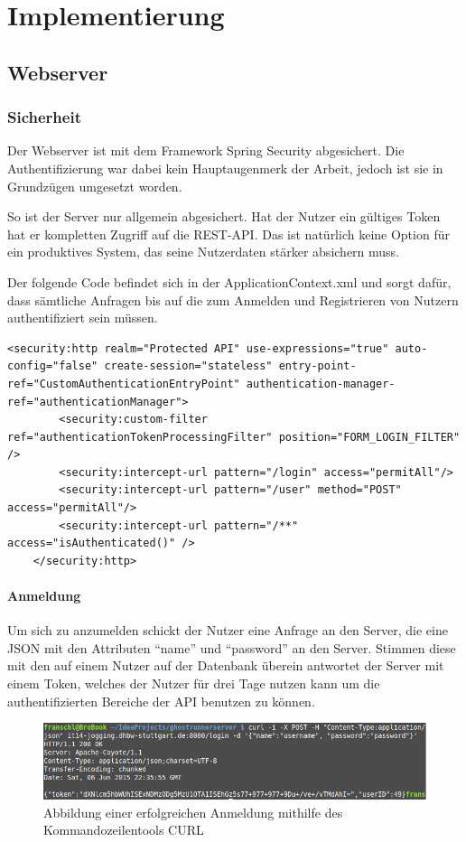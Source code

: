 \section{Implementierung}\label{kapitel6}
\subsection{Webserver}
\subsubsection{Sicherheit}
Der Webserver ist mit dem Framework Spring Security abgesichert. Die Authentifizierung war dabei kein Hauptaugenmerk der Arbeit, jedoch ist sie in Grundzügen umgesetzt worden. 

So ist der Server nur allgemein abgesichert. Hat der Nutzer ein gültiges Token hat er kompletten Zugriff auf die REST-API. Das ist natürlich keine Option für ein produktives System, das seine Nutzerdaten stärker absichern muss.

Der folgende Code befindet sich in der ApplicationContext.xml und sorgt dafür, dass sämtliche Anfragen bis auf die zum Anmelden und Registrieren von Nutzern authentifiziert sein müssen.
\lstset{language=xml}
\begin{lstlisting}[frame=htrbl, caption={Ausschnit aus der Datei ApplicationContext.xml}, breaklines=true]
<security:http realm="Protected API" use-expressions="true" auto-config="false" create-session="stateless" entry-point-ref="CustomAuthenticationEntryPoint" authentication-manager-ref="authenticationManager">
        <security:custom-filter ref="authenticationTokenProcessingFilter" position="FORM_LOGIN_FILTER" />
        <security:intercept-url pattern="/login" access="permitAll"/>
        <security:intercept-url pattern="/user" method="POST" access="permitAll"/>
        <security:intercept-url pattern="/**" access="isAuthenticated()" />
    </security:http>
\end{lstlisting}
\paragraph{Anmeldung}
Um sich zu anzumelden schickt der Nutzer eine Anfrage an den Server, die eine JSON mit den Attributen ``name'' und ``password'' an den Server. Stimmen diese mit den auf einem Nutzer auf der Datenbank überein antwortet der Server mit einem Token, welches der Nutzer für drei Tage nutzen kann um die authentifizierten Bereiche der API benutzen zu können. 
\begin{figure}[htb]
\centering
\includegraphics[width=\textwidth]{abb/curl_login}
\caption[Anmeldung]{Abbildung einer erfolgreichen Anmeldung mithilfe des Kommandozeilentools CURL}
\label{fig:Anmeldung}
\end{figure}
